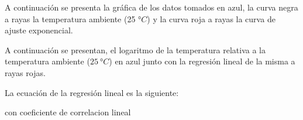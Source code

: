 A continuación se presenta la gráfica de los datos tomados en azul, la curva negra a rayas la temperatura ambiente (25 $\si{\degree C}$) y la curva roja a rayas la curva de ajuste exponencial.

A continuación se presentan, el logaritmo de la temperatura relativa a la temperatura ambiente ($25\ \si{\degree C}$) en azul junto con la regresión lineal de la misma a rayas rojas.

La ecuación de la regresión lineal es la siguiente:

con coeficiente de correlacion lineal 
